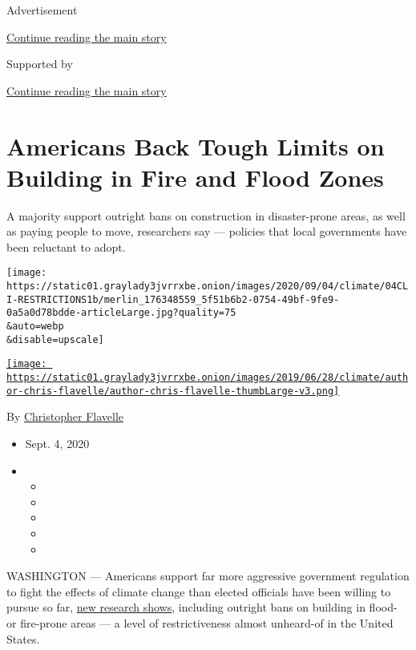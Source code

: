 Advertisement

\protect\hyperlink{after-top}{Continue reading the main story}

Supported by

\protect\hyperlink{after-sponsor}{Continue reading the main story}

\hypertarget{americans-back-tough-limits-on-building-in-fire-and-flood-zones}{%
\section{Americans Back Tough Limits on Building in Fire and Flood
Zones}\label{americans-back-tough-limits-on-building-in-fire-and-flood-zones}}

A majority support outright bans on construction in disaster-prone
areas, as well as paying people to move, researchers say --- policies
that local governments have been reluctant to adopt.

\texttt{[image: https://static01.graylady3jvrrxbe.onion/images/2020/09/04/climate/04CLI-RESTRICTIONS1b/merlin\_176348559\_5f51b6b2-0754-49bf-9fe9-0a5a0d78bdde-articleLarge.jpg?quality=75\\\&auto=webp\\\&disable=upscale]}

\href{https://www.nytimes3xbfgragh.onion/by/christopher-flavelle}{\texttt{[image: https://static01.graylady3jvrrxbe.onion/images/2019/06/28/climate/author-chris-flavelle/author-chris-flavelle-thumbLarge-v3.png]}}

By
\href{https://www.nytimes3xbfgragh.onion/by/christopher-flavelle}{Christopher
Flavelle}

\begin{itemize}
\item
  Sept. 4, 2020
\item
  \begin{itemize}
  \item
  \item
  \item
  \item
  \item
  \end{itemize}
\end{itemize}

WASHINGTON --- Americans support far more aggressive government
regulation to fight the effects of climate change than elected officials
have been willing to pursue so far,
\href{https://www.rff.org/publications/reports/climateinsights2020-natural-disasters/}{new
research shows}, including outright bans on building in flood- or
fire-prone areas --- a level of restrictiveness almost unheard-of in the
United States.

